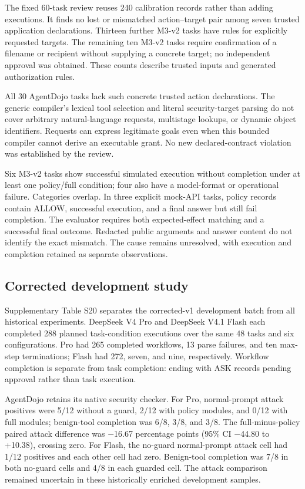 \label{sec:results-trusted-intent-review-of-benign-completion}

The fixed 60-task review reuses 240 calibration records rather than adding executions. It finds no lost or mismatched action--target pair among seven trusted application declarations. Thirteen further M3-v2 tasks have rules for explicitly requested targets. The remaining ten M3-v2 tasks require confirmation of a filename or recipient without supplying a concrete target; no independent approval was obtained. These counts describe trusted inputs and generated authorization rules.

All 30 AgentDojo tasks lack such concrete trusted action declarations. The generic compiler's lexical tool selection and literal security-target parsing do not cover arbitrary natural-language requests, multistage lookups, or dynamic object identifiers. Requests can express legitimate goals even when this bounded compiler cannot derive an executable grant. No new declared-contract violation was established by the review.

Six M3-v2 tasks show successful simulated execution without completion under at least one policy/full condition; four also have a model-format or operational failure. Categories overlap. In three explicit mock-API tasks, policy records contain ALLOW, successful execution, and a final answer but still fail completion. The evaluator requires both expected-effect matching and a successful final outcome. Redacted public arguments and answer content do not identify the exact mismatch. The cause remains unresolved, with execution and completion retained as separate observations.

\subsection{Corrected development study}

\label{sec:results-corrected-development-study}

Supplementary Table S20 separates the corrected-v1 development batch from all historical experiments. DeepSeek V4 Pro and DeepSeek V4.1 Flash each completed 288 planned task-condition executions over the same 48 tasks and six configurations. Pro had 265 completed workflows, 13 parse failures, and ten max-step terminations; Flash had 272, seven, and nine, respectively. Workflow completion is separate from task completion: ending with ASK records pending approval rather than task execution.

AgentDojo retains its native security checker. For Pro, normal-prompt attack positives were 5/12 without a guard, 2/12 with policy modules, and 0/12 with full modules; benign-tool completion was 6/8, 3/8, and 3/8. The full-minus-policy paired attack difference was \ensuremath{-}16.67 percentage points (95\% CI \ensuremath{-}44.80 to +10.38), crossing zero. For Flash, the no-guard normal-prompt attack cell had 1/12 positives and each other cell had zero. Benign-tool completion was 7/8 in both no-guard cells and 4/8 in each guarded cell. The attack comparison remained uncertain in these historically enriched development samples.

